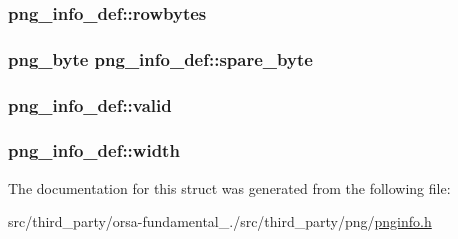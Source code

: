 \subsubsection[{rowbytes}]{ png\+\_\+info\+\_\+def\+::rowbytes}\label{structpng__info__def_ad8db9ce83eb9f443fddd006a2d0d6589}
\hypertarget{structpng__info__def_a09cbd4c9a9727499a9e2deba0a8e9134}{}
\subsubsection[{spare\+\_\+byte}]{\setlength{\rightskip}{0pt plus 5cm}png\+\_\+byte png\+\_\+info\+\_\+def\+::spare\+\_\+byte}\label{structpng__info__def_a09cbd4c9a9727499a9e2deba0a8e9134}
\hypertarget{structpng__info__def_a8695fb4fae2b7d0c8a5be4f4c563aa8a}{}
\subsubsection[{valid}]{ png\+\_\+info\+\_\+def\+::valid}\label{structpng__info__def_a8695fb4fae2b7d0c8a5be4f4c563aa8a}
\hypertarget{structpng__info__def_ac487ded925efc3985d1f6f873d2f2014}{}
\subsubsection[{width}]{ png\+\_\+info\+\_\+def\+::width}\label{structpng__info__def_ac487ded925efc3985d1f6f873d2f2014}


The documentation for this struct was generated from the following file\+:\begin{DoxyCompactItemize}
\item 
src/third\+\_\+party/orsa-\/fundamental\+\_./src/third\+\_\+party/png/\hyperlink{pnginfo_8h}{pnginfo.\+h}\end{DoxyCompactItemize}
